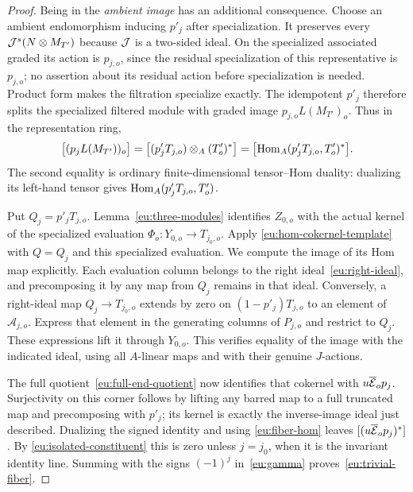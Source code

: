 \begin{proof}
Being in the \emph{ambient image} has an additional consequence.
Choose an ambient endomorphism inducing $p'_j$ after specialization.
It preserves every $\mathcal J^s(N\otimes M_{T'})$ because $\mathcal J$ is a
two-sided ideal.  On the specialized associated graded its action is
$p_{j,o}$, since the residual specialization of this representative is
$p_{j,o}$; no assertion about its residual action before specialization
is needed.  Product form makes the filtration specialize exactly.
The idempotent $p'_j$ therefore splits the specialized filtered module
with graded image $p_{j,o}L(M_{T'})_o$.  Thus in the representation ring,
\begin{equation}\label{eu:fiber-hom}
 \bigl[(p_jL(M_{T'}))_o\bigr]
 =\bigl[(p'_jT_{j,o})\otimes_A(T'_o)^*\bigr]
 =\bigl[\operatorname{Hom}_A(p'_jT_{j,o},T'_o)^*\bigr].
\end{equation}
The second equality is ordinary finite-dimensional tensor--Hom
duality: dualizing its left-hand tensor gives
$\operatorname{Hom}_A(p'_jT_{j,o},T'_o)$.

Put $Q_j=p'_jT_{j,o}$.  Lemma~\ref{eu:three-modules} identifies
$Z_{0,o}$ with the actual kernel of the specialized evaluation
$\Phi_o:Y_{0,o}\to T_{j_0,o}$.  Apply
\eqref{eu:hom-cokernel-template} with $Q=Q_j$ and this specialized
evaluation.  We compute the image
of its Hom map explicitly.  Each evaluation column belongs to
the right ideal~\eqref{eu:right-ideal}, and precomposing it by any
map from $Q_j$ remains in that ideal.  Conversely, a right-ideal map
$Q_j\to T_{j_0,o}$ extends by zero on
$(1-p'_j)T_{j,o}$ to an element of $\mathcal A_{j,o}$.
Express that element in the generating columns of $P_{j,o}$ and
restrict to $Q_j$.  These expressions lift it through $Y_{0,o}$.
This verifies equality of the image with the indicated ideal,
using all $A$-linear maps and with their genuine $J$-actions.

The full quotient~\eqref{eu:full-end-quotient} now identifies that
cokernel with $u\overline{\mathcal E}_op_j$.  Surjectivity on this corner
follows by lifting any barred map to a full truncated map and
precomposing with $p'_j$; its kernel is exactly the inverse-image
ideal just described.  Dualizing the signed identity and using
\eqref{eu:fiber-hom} leaves
$[(u\overline{\mathcal E}_op_j)^*]$.  By
\eqref{eu:isolated-constituent} this is zero unless $j=j_0$, when
it is the invariant identity line.  Summing with the signs $(-1)^j$
in~\eqref{eu:gamma} proves~\eqref{eu:trivial-fiber}.
\end{proof}

